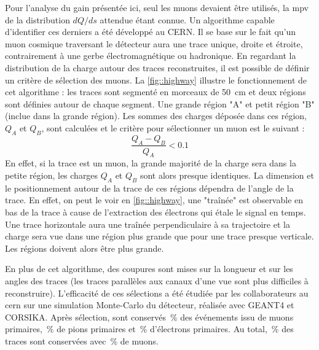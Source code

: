         Pour l'analyse du gain présentée ici, seul les muons devaient être utilisés, la \gls{mpv} de la distribution $dQ/ds$ attendue étant connue. Un algorithme capable d'identifier ces derniers a été développé au CERN. Il se base sur le fait qu'un muon cosmique traversant le détecteur aura une trace unique, droite et étroite, contrairement à une gerbe électromagnétique ou hadronique. En regardant la distribution de la charge autour des traces reconstruites, il est possible de définir un critère de sélection des muons. La \autoref{fig::highway} illustre le fonctionnement de cet algorithme : les traces sont segmenté en morceaux de \SI{50}{\centi\meter} et deux régions sont définies autour de chaque segment. Une grande région "A" et petit région "B" (inclue dans la grande région). Les sommes des charges déposée dans ces région, $Q_A$ et $Q_B$, sont calculées et le critère pour sélectionner un muon est le suivant :
        \begin{equation}\label{eq::cbr}
          \frac{Q_A-Q_B}{Q_A} < 0.1
        \end{equation}
        En effet, si la trace est un muon, la grande majorité de la charge sera dans la petite région, les charges $Q_A$ et $Q_B$ sont alors presque identiques. La dimension et le positionnement autour de la trace de ces régions dépendra de l'angle de la trace. En effet, on peut le voir en \autoref{fig::highway}, une "traînée" est observable en bas de la trace à cause de l'extraction des électrons qui étale le signal en temps. Une trace horizontale aura une traînée perpendiculaire à sa trajectoire et la charge sera vue dans une région plus grande que pour une trace presque verticale. Les régions doivent alors être plus grande.

        En plus de cet algorithme, des coupures sont mises sur la longueur et sur les angles des traces (les traces parallèles aux canaux d'une vue sont plus difficiles à reconstruire). L'efficacité de ces sélections a été étudiée par les collaborateurs au \gls{cern} sur une simulation Monte-Carlo du détecteur, réalisée avec GEANT4 et CORSIKA. Après sélection, sont conservés \,\% des événements issu de muons primaires, \,\% de pions primaires et \,\% d'électrons primaires. Au total, \,\% des traces sont conservées avec \,\% de muons.

